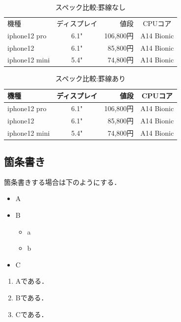 \documentclass[a4j, twocolumn]{jsarticle}
\begin{document}
\begin{table}[htb]
	\centering
	 \caption{スペック比較:罫線なし}
	  \begin{tabular}{lcrc}
		機種 & ディスプレイ & 値段 & CPUコア \\
		iphone12 pro & 6.1" & 106,800円 & A14 Bionic \\
		iphone12 & 6.1" & 85,800円 & A14 Bionic \\
		iphone12 mini & 5.4" & 74,800円 & A14 Bionic
	  \end{tabular}
	  \label{tab:sample01}
	\end{table}



	\begin{table}[htb]
		\centering
		  \caption{スペック比較:罫線あり}
		  \begin{tabular}{|l||c|r|c|}  \hline
			機種 & ディスプレイ & 値段 & CPUコア \\ \hline \hline
			iphone12 pro & 6.1" & 106,800円 & A14 Bionic \\ \hline
			iphone12 & 6.1" & 85,800円 & A14 Bionic \\ \hline
			iphone12 mini & 5.4" & 74,800円 & A14 Bionic \\ \hline
		  \end{tabular}
		  \label{tab:sample02}
		\end{table}


\subsection{箇条書き}
箇条書きする場合は下のようにする．
\begin{itemize}
	\item A
	\item B
	\begin{itemize}
		\item a
		\item b    
	\end{itemize}
	\item C	
\end{itemize}

\begin{enumerate}
	\item Aである．
	\item Bである．
	\item Cである．
\end{enumerate}
\end{document}
